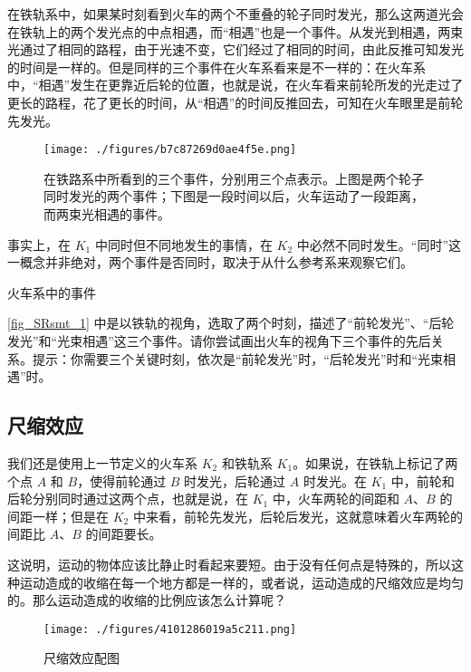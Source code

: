 在铁轨系中，如果某时刻看到火车的两个不重叠的轮子同时发光，那么这两道光会在铁轨上的两个发光点的中点相遇，而“相遇”也是一个事件。从发光到相遇，两束光通过了相同的路程，由于光速不变，它们经过了相同的时间，由此反推可知发光的时间是一样的。但是同样的三个事件在火车系看来是不一样的：在火车系中，“相遇”发生在更靠近后轮的位置，也就是说，在火车看来前轮所发的光走过了更长的路程，花了更长的时间，从“相遇”的时间反推回去，可知在火车眼里是前轮先发光。

\begin{figure}[ht]
\centering
\texttt{[image: ./figures/b7c87269d0ae4f5e.png]}
\caption{在铁路系中所看到的三个事件，分别用三个点表示。上图是两个轮子同时发光的两个事件；下图是一段时间以后，火车运动了一段距离，而两束光相遇的事件。} \label{fig_SRsmt_1}
\end{figure}

事实上，在 $K_1$ 中同时但不同地发生的事情，在 $K_2$ 中必然不同时发生。“同时”这一概念并非绝对，两个事件是否同时，取决于从什么参考系来观察它们。

\begin{exercise}{火车系中的事件}

\autoref{fig_SRsmt_1} 中是以铁轨的视角，选取了两个时刻，描述了“前轮发光”、“后轮发光”和“光束相遇”这三个事件。请你尝试画出火车的视角下三个事件的先后关系。提示：你需要三个关键时刻，依次是“前轮发光”时，“后轮发光”时和“光束相遇”时。

\end{exercise}

\subsection{尺缩效应}

我们还是使用上一节定义的火车系 $K_2$ 和铁轨系 $K_1$。如果说，在铁轨上标记了两个点 $A$ 和 $B$，使得前轮通过 $B$ 时发光，后轮通过 $A$ 时发光。在 $K_1$ 中，前轮和后轮分别同时通过这两个点，也就是说，在 $K_1$ 中，火车两轮的间距和 $A$、$B$ 的间距一样；但是在 $K_2$ 中来看，前轮先发光，后轮后发光，这就意味着火车两轮的间距比 $A$、$B$ 的间距要长。

这说明，运动的物体应该比静止时看起来要短。由于没有任何点是特殊的，所以这种运动造成的收缩在每一个地方都是一样的，或者说，运动造成的尺缩效应是均匀的。那么运动造成的收缩的比例应该怎么计算呢？

\begin{figure}[ht]
\centering
\texttt{[image: ./figures/4101286019a5c211.png]}
\caption{尺缩效应配图} \label{fig_SRsmt_2}
\end{figure}

